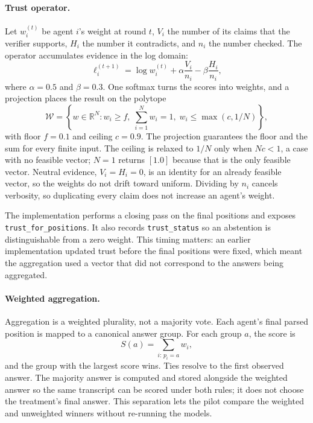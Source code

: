 \paragraph*{Trust operator.}
Let $w_i^{(t)}$ be agent $i$'s weight at round $t$, $V_i$ the number of its claims that the verifier supports, $H_i$ the number it contradicts, and $n_i$ the number checked. The operator accumulates evidence in the log domain:
\begin{equation}
  \ell_i^{(t+1)} = \log w_i^{(t)} + \alpha \frac{V_i}{n_i} - \beta \frac{H_i}{n_i},
  \label{eq:trust-update}
\end{equation}
where $\alpha=0.5$ and $\beta=0.3$. One softmax turns the scores into weights, and a projection places the result on the polytope
\begin{equation}
  \mathcal{W} = \left\{ w \in \mathbb{R}^{N} : w_i \ge f,\; \sum_{i=1}^{N} w_i = 1,\; w_i \le \max(c, 1/N) \right\},
  \label{eq:trust-simplex}
\end{equation}
with floor $f=0.1$ and ceiling $c=0.9$. The projection guarantees the floor and the sum for every finite input. The ceiling is relaxed to $1/N$ only when $Nc<1$, a case with no feasible vector; $N=1$ returns $[1.0]$ because that is the only feasible vector. Neutral evidence, $V_i=H_i=0$, is an identity for an already feasible vector, so the weights do not drift toward uniform. Dividing by $n_i$ cancels verbosity, so duplicating every claim does not increase an agent's weight.

The implementation performs a closing pass on the final positions and exposes \texttt{trust\_for\_positions}. It also records \texttt{trust\_status} so an abstention is distinguishable from a zero weight. This timing matters: an earlier implementation updated trust before the final positions were fixed, which meant the aggregation used a vector that did not correspond to the answers being aggregated.

\paragraph*{Weighted aggregation.}
Aggregation is a weighted plurality, not a majority vote. Each agent's final parsed position is mapped to a canonical answer group. For each group $a$, the score is
\begin{equation}
  S(a) = \sum_{i:\,p_i=a} w_i,
  \label{eq:weighted-aggregation}
\end{equation}
and the group with the largest score wins. Ties resolve to the first observed answer. The majority answer is computed and stored alongside the weighted answer so the same transcript can be scored under both rules; it does not choose the treatment's final answer. This separation lets the pilot compare the weighted and unweighted winners without re-running the models.

